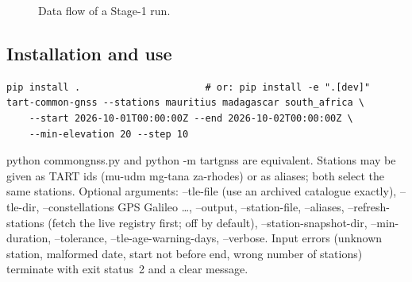\documentclass[11pt,a4paper]{article}
\newcommand{\code}[1]{{\ttfamily\def\_{\textunderscore\allowbreak}#1}}
\begin{document}
\begin{figure}[h]
\centering
{}
\caption{Data flow of a Stage-1 run.}
\label{fig:flow}
\end{figure}

\subsection{Installation and use}

\begin{lstlisting}
pip install .                      # or: pip install -e ".[dev]"
tart-common-gnss --stations mauritius madagascar south_africa \
    --start 2026-10-01T00:00:00Z --end 2026-10-02T00:00:00Z \
    --min-elevation 20 --step 10
\end{lstlisting}
\code{python common\_gnss.py} and \code{python -m tart\_gnss} are equivalent.
Stations may be given as TART ids (\code{mu-udm mg-tana za-rhodes}) or as
aliases; both select the same stations. Optional arguments:
\code{--tle-file} (use an archived catalogue exactly), \code{--tle-dir},
\code{--constellations GPS Galileo \dots}, \code{--output},
\code{--station-file}, \code{--aliases}, \code{--refresh-stations} (fetch
the live registry first; off by default), \code{--station-snapshot-dir},
\code{--min-duration},
\code{--tolerance}, \code{--tle-age-warning-days}, \code{--verbose}. Input
errors (unknown station, malformed date, start not before end, wrong number
of stations) terminate with exit status~2 and a clear message.
\end{document}
